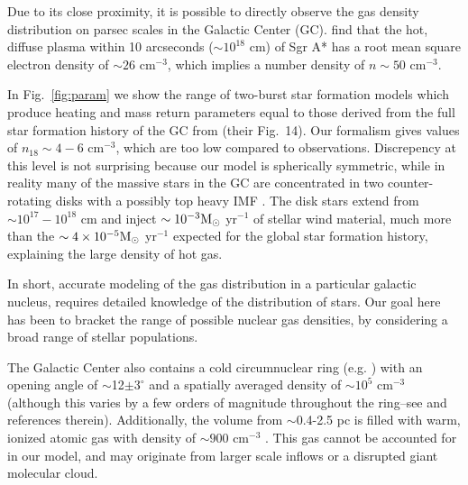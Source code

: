 \documentclass[usenatbib,fleqn]{mnras}
\newcommand{\Msun}{{\rm M_\odot}}
\begin{document}
Due to its close proximity, it is possible to directly observe the gas
density distribution on parsec scales in the Galactic Center
(GC). \citet{Baganoff+2003} find that the hot, diffuse plasma within
10 arcseconds ($\sim 10^{18}$ cm) of Sgr A* has a root mean square
electron density of $\sim 26$ cm$^{-3}$, which implies a number
density of $n\sim 50$ cm$^{-3}$. 

In Fig.~\ref{fig:param} we show the range of two-burst star formation
models which produce heating and mass return parameters equal to those
derived from the full star formation history of the GC from
\citet{Pfuhl+2011} (their Fig.~14).  Our formalism gives values of
$n_{18}\sim 4-6$ cm$^{-3}$, which are too low compared to
observations.  Discrepency at this level is not surprising because our
model is spherically symmetric, while in reality many of the massive
stars in the GC are concentrated in two counter-rotating disks
\citep{Genzel+2003} with a possibly top heavy IMF \citep{Bartko+2010}.  The
disk stars extend from $\sim 10^{17}-10^{18}$ cm and inject $\sim
10^{-3} \Msun$ yr$^{-1}$ of stellar wind material, much more than the
$\sim 4 \times 10^{-5} \Msun$ yr$^{-1}$ expected for the global star
formation history, explaining the large density of hot gas.

In short, accurate modeling of the gas distribution in a particular
galactic nucleus, requires detailed knowledge of the distribution of
stars. Our goal here has been to bracket the range of possible nuclear gas
densities, by considering a broad range of stellar populations.

The Galactic Center also contains a cold circumnuclear ring
(e.g. \citealt{Becklin+1982}) with an opening angle of
$\sim$12$\pm3^{\circ}$ \citep{Lau+2013} and a spatially averaged
density of $\sim 10^{5}$ cm$^{-3}$ (although this varies by a few
orders of magnitude throughout the ring--see \citealt{Ferriere2012} and
references therein). Additionally, the volume from $\sim$0.4-2.5 pc
is filled with warm, ionized atomic gas with density of $\sim 900$
cm$^{-3}$ \citep{Ferriere2012}. This gas cannot be accounted for in
our model, and may originate from larger scale inflows or a disrupted
giant molecular cloud.
\end{document}
